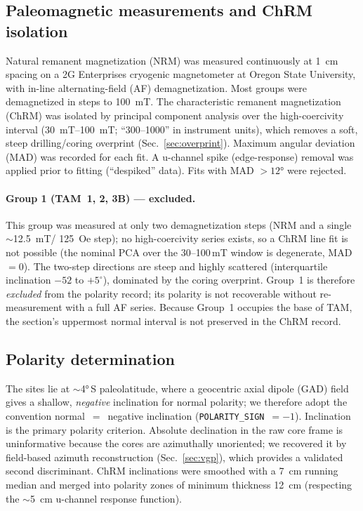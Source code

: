 \documentclass[11pt]{article}
\begin{document}
\subsection{Paleomagnetic measurements and ChRM isolation}
Natural remanent magnetization (NRM) was measured continuously at
\SI{1}{\centi\meter} spacing on a 2G Enterprises cryogenic magnetometer at
Oregon State University, with in-line alternating-field (AF) demagnetization.
Most groups were demagnetized in steps to \SI{100}{\milli\tesla}. The
characteristic remanent magnetization (ChRM) was isolated by principal
component analysis \citep{Kirschvink1980} over the high-coercivity interval
(\SIrange{30}{100}{\milli\tesla}; ``300--1000'' in instrument units), which
removes a soft, steep drilling/coring overprint (Sec.~\ref{sec:overprint}).
Maximum angular deviation (MAD) was recorded for each fit. A u-channel spike
(edge-response) removal was applied prior to fitting (``despiked'' data). Fits
with MAD $>\ang{12}$ were rejected.

\paragraph{Group 1 (TAM~1, 2, 3B) --- excluded.} This group was measured at only
two demagnetization steps (NRM and a single $\sim$\SI{12.5}{\milli\tesla}/
\SI{125}{Oe} step); no high-coercivity series exists, so a ChRM line fit is not
possible (the nominal PCA over the 30--100\,mT window is degenerate, MAD~$=0$).
The two-step directions are steep and highly scattered
(interquartile inclination $-52$ to $+5^\circ$), dominated by the coring
overprint. Group~1 is therefore \emph{excluded} from the polarity record; its
polarity is not recoverable without re-measurement with a full AF series.
Because Group~1 occupies the base of TAM, the section's uppermost normal
interval is not preserved in the ChRM record.

\subsection{Polarity determination}
The sites lie at $\sim$\ang{4}\,S paleolatitude, where a geocentric axial
dipole (GAD) field gives a shallow, \emph{negative} inclination for normal
polarity; we therefore adopt the convention normal~$=$~negative inclination
(\texttt{POLARITY\_SIGN}~$=-1$). Inclination is the primary polarity criterion.
Absolute declination in the raw core frame is uninformative because the cores
are azimuthally unoriented; we recovered it by field-based azimuth
reconstruction (Sec.~\ref{sec:vgp}), which provides a validated second
discriminant. ChRM inclinations were smoothed with a \SI{7}{\centi\meter}
running median and merged into polarity zones of minimum thickness
\SI{12}{\centi\meter} (respecting the $\sim$\SI{5}{\centi\meter} u-channel
response function).
\end{document}
